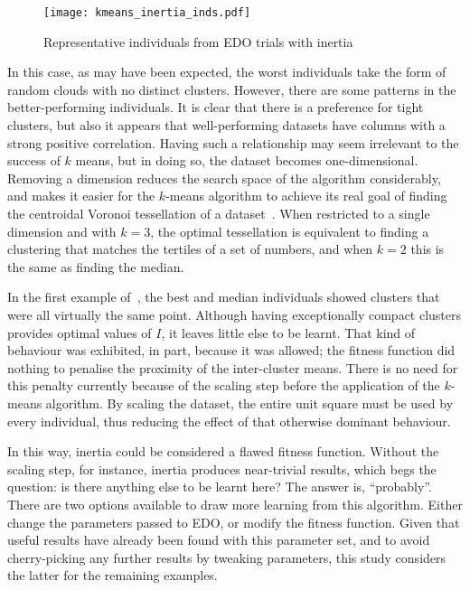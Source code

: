 \begin{figure}
    \centering
    \texttt{[image: kmeans\_inertia\_inds.pdf]}
    \caption{%
        Representative individuals from EDO trials with inertia
    }\label{fig:kmeans_inertia_inds}
\end{figure}

In this case, as may have been expected, the worst individuals take the form of
random clouds with no distinct clusters. However, there are some patterns in the
better-performing individuals. It is clear that there is a preference for tight
clusters, but also it appears that well-performing datasets have columns with a
strong positive correlation. Having such a relationship may seem irrelevant to
the success of \(k\) means, but in doing so, the dataset becomes
one-dimensional. Removing a dimension reduces the search space of the algorithm
considerably, and makes it easier for the \(k\)-means algorithm to achieve its
real goal of finding the centroidal Voronoi tessellation of a
dataset~\cite{Du2006}. When restricted to a single dimension and with \(k = 3\),
the optimal tessellation is equivalent to finding a clustering that matches the
tertiles of a set of numbers, and when \(k = 2\) this is the same as finding the
median.


In the first example of~\cite{Wilde2020:edo}, the best and median individuals
showed clusters that were all virtually the same point. Although having
exceptionally compact clusters provides optimal values of \(I\), it leaves
little else to be learnt. That kind of behaviour was exhibited, in part, because
it was allowed; the fitness function did nothing to penalise the proximity of
the inter-cluster means. There is no need for this penalty currently because of
the scaling step before the application of the \(k\)-means algorithm. By scaling
the dataset, the entire unit square must be used by every individual, thus
reducing the effect of that otherwise dominant behaviour.

In this way, inertia could be considered a flawed fitness function. Without the
scaling step, for instance, inertia produces near-trivial results, which begs
the question: is there anything else to be learnt here? The answer is,
``probably''. There are two options available to draw more learning from this
algorithm. Either change the parameters passed to EDO, or modify the fitness
function. Given that useful results have already been found with this parameter
set, and to avoid cherry-picking any further results by tweaking parameters,
this study considers the latter for the remaining examples.

